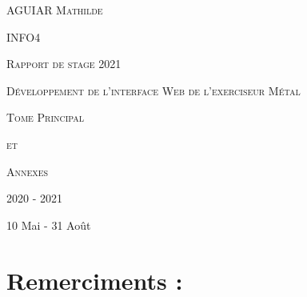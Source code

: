 \documentclass[12pt]{article}
\begin{document}
\singlespace %

\begin{titlepage}
    \par
	\hfill
	\par
	\vfill
	
	\centering
	{\scshape \Large AGUIAR Mathilde \par}
	{\scshape \Large INFO4 \par}
	{\scshape \Large Rapport de stage 2021 \par}
	
	\vfill
	{\scshape \huge Développement de l'interface Web de l'exerciseur Métal \par}
	
	\vfill
	{\scshape\Large Tome Principal \par}
	{\scshape \Large et \par}
	{\scshape \Large Annexes \par}
	
	\vfill
	{\Large 2020 - 2021 \par}
	{\Large 10 Mai - 31 Août \par}
\end{titlepage}



\newpage


\section*{Remerciments :}
\end{document}
